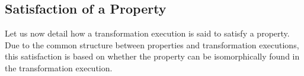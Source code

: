 %

\subsection{Satisfaction of a Property}
\label{sec:prop_satisfaction}

Let us now detail how a transformation execution is said to satisfy a property. Due to the common structure between properties and transformation executions, this satisfaction is based on whether the property can be isomorphically found in the transformation execution.

